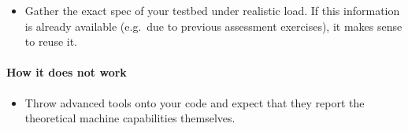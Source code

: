 \begin{itemize}[noitemsep]
  \item[$\boxplus$] Gather the exact spec of your testbed under realistic load. If this information is already available (e.g.~due to previous assessment exercises), it makes sense to reuse it.
\end{itemize}


\paragraph*{How it does not work}

\begin{itemize}[noitemsep]
  \item[$\boxminus$] Throw advanced tools onto your code and expect that they report the theoretical machine capabilities themselves.
\end{itemize}
